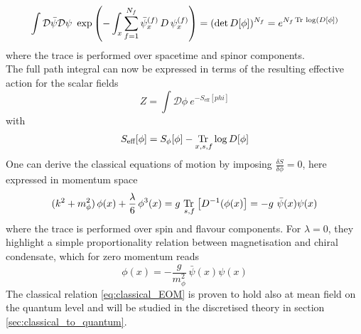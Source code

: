 \begin{equation*}
    \int \mathcal{D} \bar\psi \mathcal{D} \psi \ \exp\left( - \int_x \sum_{f=1}^{N_f} \bar\psi_x^{(f)} \,  D \, \psi_x^{(f)} \right) = (\text{det} \, D[\phi])^{N_f} = e^{N_f\operatorname{\text{Tr} \,} \log (D[\phi])}
\end{equation*}
where the trace is performed over spacetime and spinor components. \\ 
The full path integral can now be expressed in terms of the resulting effective action for the scalar fields
\begin{equation*}
    Z = \int \mathcal{D}\phi \ e^{-S_\text{eff}[phi]}
\end{equation*}
with
\begin{equation}
    S_\text{eff}[\phi] = S_{\phi}[\phi] - \underset{x,s,f}{\operatorname{\text{Tr} \,}} \log D[\phi]
    \label{eq:effective_action_no_fermions}
\end{equation}
One can derive the classical equations of motion by imposing $\frac{\delta S}{\delta \phi} = 0$, here expressed in momentum space
\begin{equation*}
     (k^2 + m_\phi^2) \, \phi(x) + \frac{\lambda}{6} \, \phi^3(x) = g \ \underset{s,f}{\tr} \left[D^{-1}(\phi(x)\right] = - g \ \bar\psi(x) \psi(x)
\end{equation*}
where the trace is performed over spin and flavour components. For $\lambda = 0$, they highlight a simple proportionality relation between magnetisation and chiral condensate, which for zero momentum reads
\begin{equation}
    \phi(x) = - \frac{g}{m_\phi^2} \ \bar \psi(x) \psi(x)
    \label{eq:classical_EOM}
\end{equation}
The classical relation \eqref{eq:classical_EOM} is proven to hold also at mean field on the quantum level \cite{Buballa2005NJL-modelMatter} and will be studied in the discretised theory in section \ref{sec:classical_to_quantum}. \\~\\


